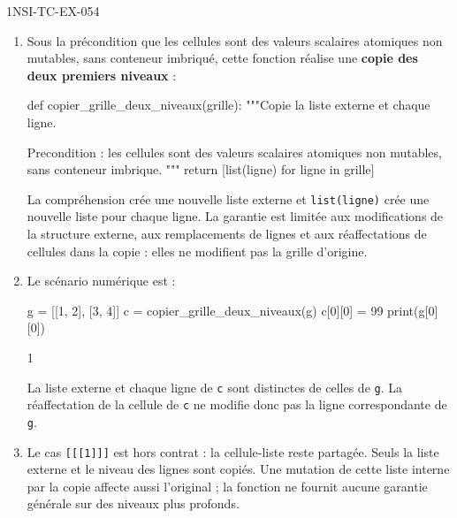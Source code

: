 \begin{corrige}{1NSI-TC-EX-054}
\begin{enumerate}
  \item Sous la précondition que les cellules sont des valeurs scalaires atomiques
        non mutables, sans conteneur imbriqué, cette fonction réalise une
        \textbf{copie des deux premiers niveaux} :
\begin{python}
def copier_grille_deux_niveaux(grille):
    """Copie la liste externe et chaque ligne.

    Precondition : les cellules sont des valeurs scalaires atomiques non mutables,
    sans conteneur imbrique.
    """
    return [list(ligne) for ligne in grille]
\end{python}
La compréhension crée une nouvelle liste externe et \lstinline{list(ligne)} crée
une nouvelle liste pour chaque ligne. La garantie est limitée aux modifications de
la structure externe, aux remplacements de lignes et aux réaffectations de cellules
dans la copie : elles ne modifient pas la grille d'origine.

  \item Le scénario numérique est :
\begin{python}
g = [[1, 2], [3, 4]]
c = copier_grille_deux_niveaux(g)
c[0][0] = 99
print(g[0][0])
\end{python}
\begin{console}
1
\end{console}
La liste externe et chaque ligne de \lstinline{c} sont distinctes de celles de
\lstinline{g}. La réaffectation de la cellule de \lstinline{c} ne modifie donc pas
la ligne correspondante de \lstinline{g}.

  \item Le cas \lstinline{[[[1]]]} est hors contrat : la cellule-liste reste partagée.
        Seuls la liste externe et le niveau des lignes sont copiés. Une mutation de
        cette liste interne par la copie affecte aussi l'original ; la fonction ne
        fournit aucune garantie générale sur des niveaux plus profonds.
\end{enumerate}
\end{corrige}
